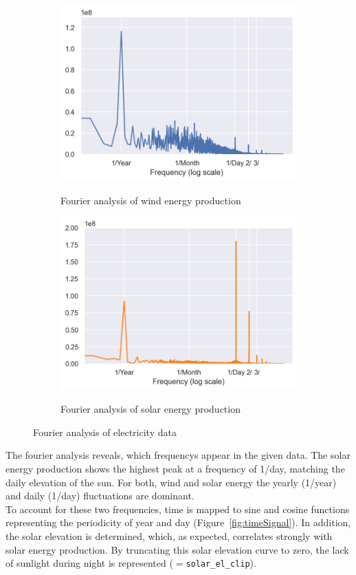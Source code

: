 \documentclass[11pt,table]{article}
\begin{document}
\begin{figure}[H]
\centering
\begin{subfigure}{.5\textwidth}
  \centering
  \includegraphics[width=0.9\linewidth]{Figures/fourierWind.png}
  \label{fig:fourierWind}
  \caption{Fourier analysis of wind energy production}
\end{subfigure}%
\begin{subfigure}{.5\textwidth}
  \centering
  \includegraphics[width=0.9\linewidth]{Figures/fourierSolar.png}
  \label{fig:fourierSolar}
  \caption{Fourier analysis of solar energy production}
\end{subfigure}
\caption{Fourier analysis of electricity data}
\label{fig:fourier}
\end{figure}

The fourier analysis reveals, which frequencys appear in the given data. The solar energy production shows the highest peak at a frequency of 1/day, matching the daily elevation of the sun. For both, wind and solar energy the yearly (1/year) and daily (1/day) fluctuations are dominant.\\
To account for these two frequencies, time is mapped to sine and cosine functions representing the periodicity of year and day 
(Figure~\ref{fig:timeSignal}). 
In addition, the solar elevation is determined, which, as expected, correlates strongly with solar energy production. 
By truncating this solar elevation curve to zero, 
the lack of sunlight during night is represented
($=$\verb|solar_el_clip|).
\end{document}
